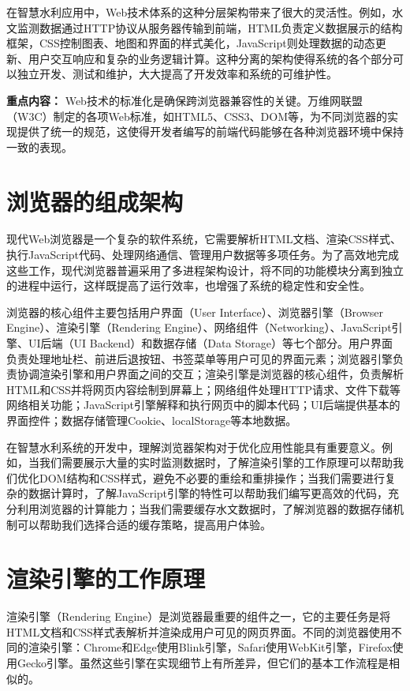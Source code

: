 在智慧水利应用中，Web技术体系的这种分层架构带来了很大的灵活性。例如，水文监测数据通过HTTP协议从服务器传输到前端，HTML负责定义数据展示的结构框架，CSS控制图表、地图和界面的样式美化，JavaScript则处理数据的动态更新、用户交互响应和复杂的业务逻辑计算。这种分离的架构使得系统的各个部分可以独立开发、测试和维护，大大提高了开发效率和系统的可维护性。

\textbf{重点内容：} Web技术的标准化是确保跨浏览器兼容性的关键。万维网联盟（W3C）制定的各项Web标准，如HTML5、CSS3、DOM等，为不同浏览器的实现提供了统一的规范，这使得开发者编写的前端代码能够在各种浏览器环境中保持一致的表现。

\section{浏览器的组成架构}

现代Web浏览器是一个复杂的软件系统，它需要解析HTML文档、渲染CSS样式、执行JavaScript代码、处理网络通信、管理用户数据等多项任务。为了高效地完成这些工作，现代浏览器普遍采用了多进程架构设计，将不同的功能模块分离到独立的进程中运行，这样既提高了运行效率，也增强了系统的稳定性和安全性。

浏览器的核心组件主要包括用户界面（User Interface）、浏览器引擎（Browser Engine）、渲染引擎（Rendering Engine）、网络组件（Networking）、JavaScript引擎、UI后端（UI Backend）和数据存储（Data Storage）等七个部分。用户界面负责处理地址栏、前进后退按钮、书签菜单等用户可见的界面元素；浏览器引擎负责协调渲染引擎和用户界面之间的交互；渲染引擎是浏览器的核心组件，负责解析HTML和CSS并将网页内容绘制到屏幕上；网络组件处理HTTP请求、文件下载等网络相关功能；JavaScript引擎解释和执行网页中的脚本代码；UI后端提供基本的界面控件；数据存储管理Cookie、localStorage等本地数据。

在智慧水利系统的开发中，理解浏览器架构对于优化应用性能具有重要意义。例如，当我们需要展示大量的实时监测数据时，了解渲染引擎的工作原理可以帮助我们优化DOM结构和CSS样式，避免不必要的重绘和重排操作；当我们需要进行复杂的数据计算时，了解JavaScript引擎的特性可以帮助我们编写更高效的代码，充分利用浏览器的计算能力；当我们需要缓存水文数据时，了解浏览器的数据存储机制可以帮助我们选择合适的缓存策略，提高用户体验。

\section{渲染引擎的工作原理}

渲染引擎（Rendering Engine）是浏览器最重要的组件之一，它的主要任务是将HTML文档和CSS样式表解析并渲染成用户可见的网页界面。不同的浏览器使用不同的渲染引擎：Chrome和Edge使用Blink引擎，Safari使用WebKit引擎，Firefox使用Gecko引擎。虽然这些引擎在实现细节上有所差异，但它们的基本工作流程是相似的。

